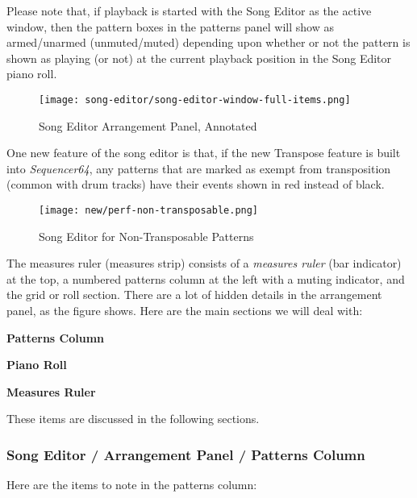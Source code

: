    Please note that, if playback is started with the Song Editor as the
   active window, then the pattern boxes in the patterns panel will
   show as armed/unarmed (unmuted/muted) depending upon whether or not the
   pattern is shown as playing (or not) at the current playback position in
   the Song Editor piano roll.

\begin{figure}[H]
   \centering 
   \texttt{[image: song-editor/song-editor-window-full-items.png]}
   \caption{Song Editor Arrangement Panel, Annotated}
   \label{fig:song_editor_window_full_items}
\end{figure}

   One new feature of the song editor is that, if the new Transpose feature is
   built into \textsl{Sequencer64}, any patterns that are marked as exempt from
   transposition (common with drum tracks) have their events shown in red
   instead of black.

\begin{figure}[H]
   \centering 
   \texttt{[image: new/perf-non-transposable.png]}
   \caption{Song Editor for Non-Transposable Patterns}
   \label{fig:song_editor_non_transposable_items}
\end{figure}

   The measures ruler (measures strip)
   consists of a \textsl{measures ruler} (bar indicator) at the top, a
   numbered patterns column at the left with a muting indicator, and the
   grid or roll section.  There are a lot of hidden details in the
   arrangement panel, as the figure shows.  Here are the main sections we
   will deal with:

   \begin{enumber}
      \item \textbf{Patterns Column}
      \item \textbf{Piano Roll}
      \item \textbf{Measures Ruler}
   \end{enumber}

   These items are discussed in the following sections.

\subsubsection{Song Editor / Arrangement Panel / Patterns Column}
\label{subsubsec:seq64_song_editor_arrangement_panel_patterns_column}

   Here are the items to note in the patterns column:


